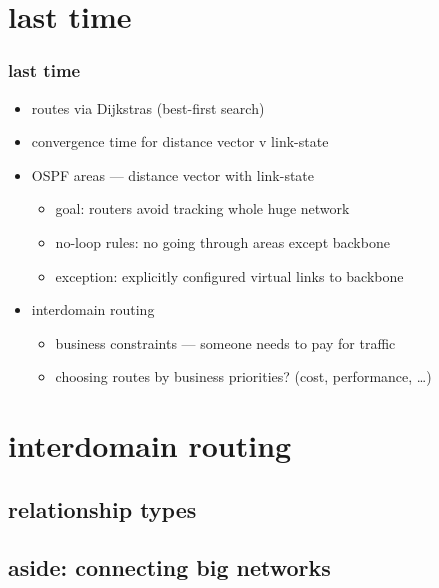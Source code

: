 \date{}
\title{}
\date{}

\begin{frame}
    \titlepage
\end{frame}


\section{last time}
\begin{frame}
\frametitle{last time}
\begin{itemize}
    \item routes via Dijkstras (best-first search)
    \item convergence time for distance vector v link-state
    \item OSPF areas --- distance vector with link-state
        \begin{itemize}
        \item goal: routers avoid tracking whole huge network
        \item no-loop rules: no going through areas except backbone
        \item exception: explicitly configured virtual links to backbone
        \end{itemize}
    \item interdomain routing
        \begin{itemize}
        \item business constraints --- someone needs to pay for traffic
        \item choosing routes by business priorities? (cost, performance, \ldots)
        \end{itemize}
\end{itemize}
\end{frame}

\section{interdomain routing}

\subsection{relationship types}


\subsection{aside: connecting big networks}


